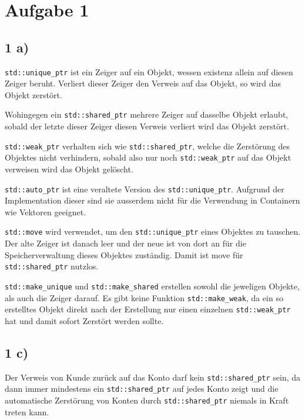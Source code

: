 \documentclass[]{article}
\begin{document}
% 
\section*{Aufgabe 1}
\subsection*{1 a)}
\lstinline|std::unique_ptr| ist ein Zeiger auf ein Objekt, wessen existenz allein auf diesen Zeiger beruht. Verliert dieser Zeiger den Verweis auf das Objekt, so wird das Objekt zerstört.

Wohingegen ein \lstinline|std::shared_ptr| mehrere Zeiger auf dasselbe Objekt erlaubt, sobald der letzte dieser Zeiger diesen Verweis verliert wird das Objekt zerstört.

\lstinline|std::weak_ptr| verhalten sich wie \lstinline|std::shared_ptr|, welche die Zerstörung des Objektes nicht verhindern, sobald also nur noch \lstinline|std::weak_ptr| auf das Objekt verweisen wird das Objekt gelöscht.

\lstinline|std::auto_ptr| ist eine veraltete Version des \lstinline|std::unique_ptr|. Aufgrund der Implementation dieser sind sie ausserdem nicht für die Verwendung in Containern wie Vektoren geeignet.

\lstinline|std::move| wird verwendet, um den \lstinline|std::unique_ptr| eines Objektes zu tauschen. Der alte Zeiger ist danach leer und der neue ist von dort an für die Speicherverwaltung dieses Objektes zuständig. Damit ist move für \lstinline|std::shared_ptr| nutzlos.

\lstinline|std::make_unique| und \lstinline|std::make_shared| erstellen sowohl die jeweligen Objekte, als auch die Zeiger darauf. Es gibt keine Funktion \lstinline|std::make_weak|, da ein so erstelltes Objekt direkt nach der Erstellung nur einen einzelnen \lstinline|std::weak_ptr| hat und damit sofort Zerstört werden sollte.

\subsection*{1 c)}
Der Verweis von Kunde zurück auf das Konto darf kein \lstinline|std::shared_ptr| sein, da dann immer mindestens ein \lstinline|std::shared_ptr| auf jedes Konto zeigt und die automatische Zerstörung von Konten durch \lstinline|std::shared_ptr| niemals in Kraft treten kann.
\end{document}
